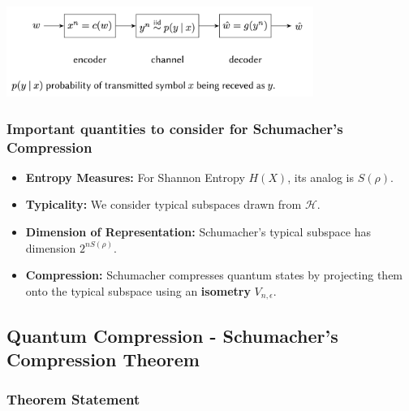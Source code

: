 \begin{center}
    \includegraphics[width=0.75\textwidth]{figures/shannon_pic.png}
\end{center}

\subsubsection{Important quantities to consider for Schumacher's Compression}

\begin{itemize}
\item \textbf{Entropy Measures:}
For Shannon Entropy \(H(X)\), its analog is \(S(\rho)\).

\item \textbf{Typicality:}
We consider typical subspaces drawn from \(\mathcal{H}\).

\item \textbf{Dimension of Representation:}
Schumacher's typical subspace has dimension \(2^{nS(\rho)}\).

\item \textbf{Compression:}
Schumacher compresses quantum states by projecting them onto the typical subspace using an \textbf{isometry} \(V_{n,\epsilon}\).

\end{itemize}

\subsection{Quantum Compression - Schumacher's Compression Theorem}

\subsubsection{Theorem Statement}

